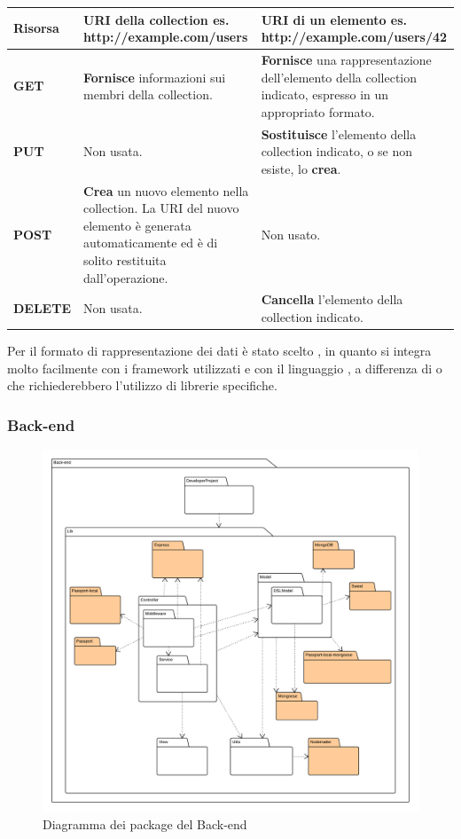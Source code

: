 \begingroup
\renewcommand*{\arraystretch}{1.5}
\begin{tabularx}{\textwidth}{|P{2.5cm}|X|X|}
\hline
	\textbf{Risorsa} & \textbf{URI della collection} \newline es. http://example.com/users & \textbf{URI di un elemento} \newline es. http://example.com/users/42 \\
\hline
	\textbf{GET} & \textbf{Fornisce} informazioni sui membri della collection. & \textbf{Fornisce} una rappresentazione dell'elemento della collection indicato, espresso in un appropriato formato. \\
\hline
	\textbf{PUT} & Non usata. & \textbf{Sostituisce} l'elemento della collection indicato, o se non esiste, lo \textbf{crea}. \\
\hline
	\textbf{POST} & \textbf{Crea} un nuovo elemento nella collection. La URI del nuovo elemento è generata automaticamente ed è di solito restituita dall'operazione. & Non usato. \\
\hline
	\textbf{DELETE} & Non usata. & \textbf{Cancella} l'elemento della collection indicato. \\
\hline
\end{tabularx}
\endgroup

Per il formato di rappresentazione dei dati è stato scelto , in quanto si integra molto facilmente con i framework utilizzati e con il linguaggio , a differenza di  o  che richiederebbero l'utilizzo di librerie specifiche.


\subsubsection{Back-end}

\begin{figure}[H]
\centering
\includegraphics[width=\textwidth]{uml/package/Back-end.png}
\caption{Diagramma dei package del Back-end}
\end{figure}

